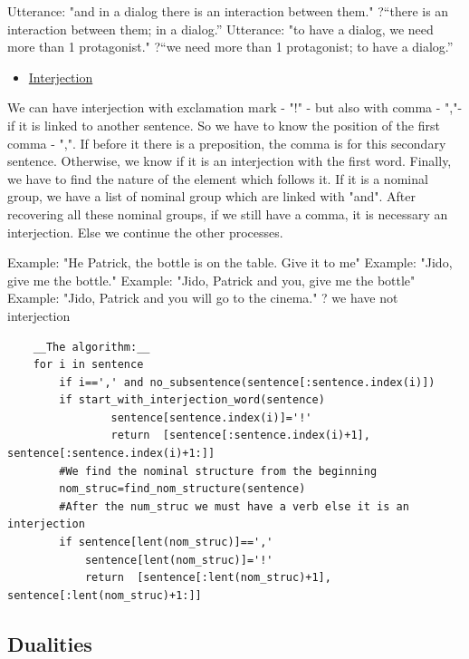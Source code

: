 \documentclass[twoside,a4paper,10pt]{report}
\begin{document}
\small
\begin{verbatimtab}
  Utterance: "and in a dialog there is an interaction between them."
  ?“there is an interaction between them; in a dialog.”
  Utterance: "to have a dialog, we need more than 1 protagonist."
  ?“we need more than 1 protagonist; to have a dialog.”
\end{verbatimtab}
\normalsize

\begin{itemize}
    \item  \underline{Interjection}
\end{itemize}
We can have interjection with exclamation mark - "!" - but also with comma - ","- if it is linked to another sentence. So we have to know the position of the first comma - ",". If before it there is a preposition, the comma is for this secondary sentence. Otherwise, we know if it is an interjection with the first word. Finally, we have to find the nature of the element which follows it. If it is a nominal group, we have a list of nominal group which are linked with "and". After recovering all these nominal groups, if we still have a comma, it is necessary an interjection. Else we continue the other processes.


\small
\begin{verbatimtab}
  Example: "He Patrick, the bottle is on the table. Give it to me"
  Example: "Jido, give me the bottle." 
  Example: "Jido, Patrick and you, give me the bottle"
  Example: "Jido, Patrick and you will go to the cinema." ? we have not interjection
\end{verbatimtab}
\normalsize

\lstset{language=python}
\begin{lstlisting}
    __The algorithm:__
    for i in sentence
        if i==',' and no_subsentence(sentence[:sentence.index(i)])
	    if start_with_interjection_word(sentence)
                sentence[sentence.index(i)]='!'
                return  [sentence[:sentence.index(i)+1], sentence[:sentence.index(i)+1:]]
        #We find the nominal structure from the beginning
        nom_struc=find_nom_structure(sentence)
        #After the num_struc we must have a verb else it is an interjection
        if sentence[lent(nom_struc)]==','
            sentence[lent(nom_struc)]='!'
            return  [sentence[:lent(nom_struc)+1], sentence[:lent(nom_struc)+1:]]

\end{lstlisting}

\subsection{Dualities}
\label{ceb3780718f195cca0227bdf527d4a06}%
\end{document}
